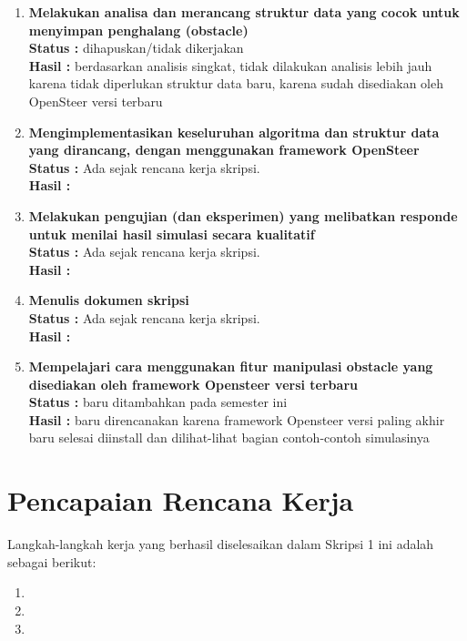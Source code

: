 \documentclass[a4paper,twoside]{article}
\begin{document}
\begin{enumerate}
	\item \textbf{Melakukan analisa dan merancang struktur data yang cocok untuk menyimpan penghalang (obstacle)}\\
	{\bf Status :} dihapuskan/tidak dikerjakan \\
	{\bf Hasil :} berdasarkan analisis singkat, tidak dilakukan analisis lebih jauh karena tidak diperlukan struktur data baru, karena sudah disediakan oleh OpenSteer versi terbaru
	
	\item \textbf{Mengimplementasikan keseluruhan algoritma dan struktur data yang dirancang, dengan menggunakan framework OpenSteer} \\
	{\bf Status :} Ada sejak rencana kerja skripsi.\\
	{\bf Hasil :}
	
	\item \textbf{Melakukan pengujian (dan eksperimen) yang melibatkan responde untuk menilai hasil simulasi secara kualitatif}\\
	{\bf Status :} Ada sejak rencana kerja skripsi.\\
	{\bf Hasil :}
	
	\item \textbf{Menulis dokumen skripsi}\\
	{\bf Status :} Ada sejak rencana kerja skripsi.\\
	{\bf Hasil :} \lipsum[1]
	
	\item \textbf{Mempelajari cara menggunakan fitur manipulasi obstacle yang disediakan oleh framework Opensteer versi terbaru}\\
	{\bf Status :} baru ditambahkan pada semester ini\\
	{\bf Hasil :} baru direncanakan karena framework Opensteer versi paling akhir baru selesai diinstall dan dilihat-lihat bagian contoh-contoh simulasinya
	
	
\end{enumerate}

\section{Pencapaian Rencana Kerja}
Langkah-langkah kerja yang berhasil diselesaikan dalam Skripsi 1 ini adalah sebagai berikut:
\begin{enumerate}
	\item
	\item
	\item
\end{enumerate}
\end{document}
